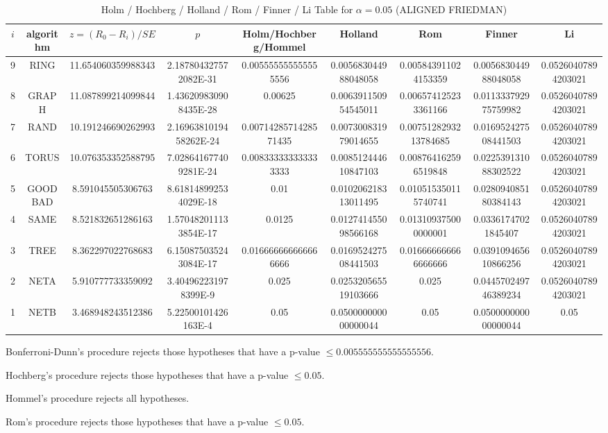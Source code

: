 \documentclass[a4paper,10pt]{article}
\begin{document}
\begin{landscape}
\newpage

\begin{table}[!htp]
\centering\scriptsize
\caption{Holm / Hochberg / Holland / Rom / Finner / Li Table for $\alpha=0.05$ (ALIGNED FRIEDMAN)}
\begin{tabular}{ccccccccc}
$i$&algorithm&$z=(R_0 - R_i)/SE$&$p$&Holm/Hochberg/Hommel&Holland&Rom&Finner&Li\\
\hline
9& RING&11.654060359988343&2.187804327572082E-31&0.005555555555555556&0.005683044988048058&0.005843911024153359&0.005683044988048058&0.05260407894203021\\
8& GRAPH&11.087899214099844&1.436209830908435E-28&0.00625&0.006391150954545011&0.006574125233361166&0.011333792975759982&0.05260407894203021\\
7& RAND&10.191246690262993&2.1696381019458262E-24&0.0071428571428571435&0.007300831979014655&0.0075128293213784685&0.016952427508441503&0.05260407894203021\\
6& TORUS&10.076353352588795&7.028641677409281E-24&0.008333333333333333&0.008512444610847103&0.008764162596519848&0.022539131088302522&0.05260407894203021\\
5& GOODBAD&8.591045505306763&8.618148992534029E-18&0.01&0.010206218313011495&0.010515350115740741&0.028094085180384143&0.05260407894203021\\
4& SAME&8.521832651286163&1.570482011133854E-17&0.0125&0.012741455098566168&0.013109375000000001&0.03361747021845407&0.05260407894203021\\
3& TREE&8.362297022768683&6.150875035243084E-17&0.016666666666666666&0.016952427508441503&0.016666666666666666&0.039109465610866256&0.05260407894203021\\
2& NETA&5.910777733359092&3.404962231978399E-9&0.025&0.025320565519103666&0.025&0.044570249746389234&0.05260407894203021\\
1& NETB&3.468948243512386&5.22500101426163E-4&0.05&0.050000000000000044&0.05&0.050000000000000044&0.05\\
\hline
\end{tabular}
\end{table}
Bonferroni-Dunn's procedure rejects those hypotheses that have a p-value $\le0.005555555555555556$.


Hochberg's procedure rejects those hypotheses that have a p-value $\le0.05$.


Hommel's procedure rejects all hypotheses.


Rom's procedure rejects those hypotheses that have a p-value $\le0.05$.



\end{landscape}
\end{document}
